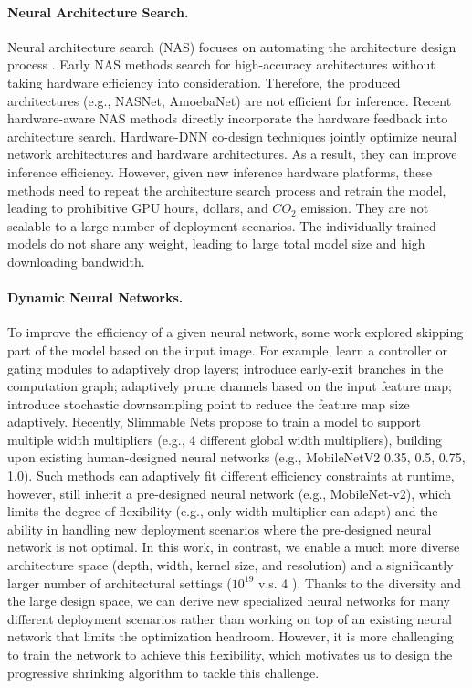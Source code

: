 \documentclass{article} \usepackage{iclr2020_conference,times}
\newcommand{\myparagraph}[1]{\vspace{-3pt}\paragraph{#1}}
\begin{document}
\myparagraph{Neural Architecture Search.} 
Neural architecture search (NAS) focuses on automating the architecture design process \citep{zoph2017neural,zoph2018learning,real2018regularized,cai2018efficient,liu2019darts}.
Early NAS methods \citep{zoph2018learning,real2018regularized,cai2018path} search for high-accuracy architectures without taking hardware efficiency into consideration. Therefore, the produced architectures (e.g., NASNet, AmoebaNet) are not efficient for inference. Recent hardware-aware NAS methods \citep{cai2019proxylessnas, tan2018mnasnet, wu2018fbnet} directly incorporate the hardware feedback into architecture search. Hardware-DNN co-design techniques \citep{jiang2019accuracy,jiang2019hardware,hao2019fpga} jointly optimize neural network architectures and hardware architectures. 
As a result, they can improve inference efficiency. 
However, given new inference hardware platforms, these methods need to repeat the architecture search process and retrain the model, leading to prohibitive GPU hours, dollars, and $CO_2$ emission. They are not scalable to a large number of deployment scenarios. The individually trained models do not share any weight, leading to large total model size and high downloading bandwidth.

\myparagraph{Dynamic Neural Networks.} 
To improve the efficiency of a given neural network, some work explored skipping part of the model based on the input image. For example, \cite{wu2018blockdrop,liu2018dynamic,wang2018skipnet} learn a controller or gating modules to adaptively drop layers; \cite{huang2017multi} introduce early-exit branches in the computation graph;
\cite{lin2017runtime} adaptively prune channels based on the input feature map; \cite{kuen2018stochastic} introduce stochastic downsampling point to reduce the feature map size adaptively. Recently, Slimmable Nets \citep{yu2018slimmable,yu2019universally} propose to train a model to support multiple width multipliers (e.g., 4 different global width multipliers), building upon existing human-designed neural networks (e.g., MobileNetV2 0.35, 0.5, 0.75, 1.0). Such methods can adaptively fit different efficiency constraints at runtime, however, still inherit a pre-designed neural network (e.g., MobileNet-v2), which limits the degree of flexibility (e.g., only width multiplier can adapt) and the ability in handling new deployment scenarios where the pre-designed neural network is not optimal. In this work, in contrast, we enable a much more diverse architecture space (depth, width, kernel size, and resolution) and a significantly larger number of architectural settings ($10^{19}$ v.s. 4 \citep{yu2018slimmable}). Thanks to the diversity and the large design space, we can derive new specialized neural networks for many different deployment scenarios rather than working on top of an existing neural network that limits the optimization headroom. However, it is more challenging to train the network to achieve this flexibility, which motivates us to design the progressive shrinking algorithm to tackle this challenge.  
\end{document}

